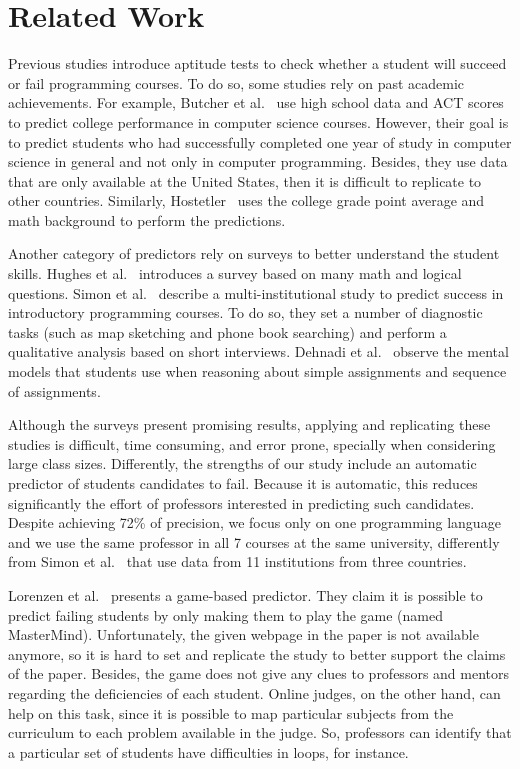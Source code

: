 \section{Related Work}

\label{sec:related}

Previous studies introduce aptitude tests to check whether a student will succeed or fail programming courses. To do so, some studies rely on past academic achievements. For example, Butcher et al.~\cite{butcher-predictor-high-school-1985} use high school data and ACT scores to predict college performance in computer science courses. However, their goal is to predict students who had successfully completed one year of study in computer science in general and not only in computer programming. Besides, they use data that are only available at the United States, then it is difficult to replicate to other countries. Similarly, Hostetler~\cite{hostetler-aptitude-1983} uses the college grade point average and math background to perform the predictions.

Another category of predictors rely on surveys to better understand the student skills. Hughes et al.~\cite{ibm-aptitude-test} introduces a survey based on many math and logical questions. Simon et al.~\cite{simon-predictors-ace2006} describe a multi-institutional study to predict success in introductory programming courses. To do so, they set a number of diagnostic tasks (such as map sketching and phone book searching) and perform a qualitative analysis based on short interviews. Dehnadi et al.~\cite{camel-2006} observe the mental models that students use when reasoning about simple assignments and sequence of assignments.

Although the surveys present promising results, applying and replicating these studies is difficult, time consuming, and error prone, specially when considering large class sizes. Differently, the strengths of our study include an automatic predictor of students candidates to fail. Because it is automatic, this reduces significantly the effort of professors interested in predicting such candidates. Despite achieving 72\% of precision, we focus only on one programming language and we use the same professor in all 7 courses at the same university, differently from Simon et al.~\cite{simon-predictors-ace2006} that use data from 11 institutions from three countries.

Lorenzen et al.~\cite{lorenzenC06-mastermind-predictor-sigcse2008} presents a game-based predictor. They claim it is possible to predict failing students by only making them to play the game (named MasterMind). Unfortunately, the given webpage in the paper is not available anymore, so it is hard to set and replicate the study to better support the claims of the paper. Besides, the game does not give any clues to professors and mentors regarding the deficiencies of each student. Online judges, on the other hand, can help on this task, since it is possible to map particular subjects from the curriculum to each problem available in the judge. So, professors can identify that a particular set of students have difficulties in loops, for instance.

